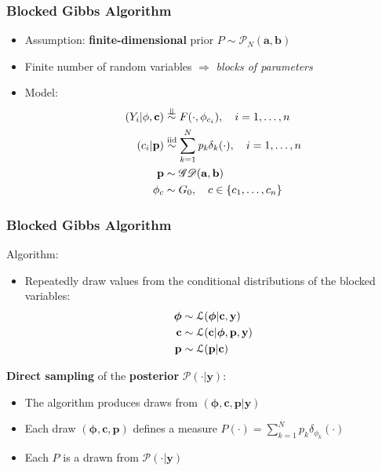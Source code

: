 \begin{frame}
	\frametitle{Blocked Gibbs Algorithm}
	\begin{itemize}
	    \item Assumption: \textbf{finite-dimensional} prior $P \sim  \mathscr{P}_{N}(\mathbf{a},\mathbf{b})$
        \item Finite number of random variables $\Rightarrow$ \textit{blocks of parameters}
        \item Model:
        \begin{align*}
            (Y_{i}|\mathbf{\phi},\mathbf{c})&\indsim F(\cdot,\phi_{c_{i}}), \quad i=1,\dots,n \\
            (c_{i}|\mathbf{p})&\iidsim\sum\limits_{k=1}^N \mathit{p_{k}}\delta_{k}(\cdot), \quad i=1,\dots,n \\
            \mathbf{p} &\sim \mathscr{GD}(\mathbf{a},\mathbf{b}) \\
            \mathbf{\phi}_{c} & \sim G_{0}, \quad c \in \{c_1,\dots, c_n\}
        \end{align*}



	\end{itemize}
\end{frame}




\begin{frame}
	\frametitle{Blocked Gibbs Algorithm}
	Algorithm:
	\begin{itemize}
		\item Repeatedly draw values from the conditional distributions of the blocked variables:
		\begin{align*}
			\boldsymbol\phi &\sim \mathcal L(\boldsymbol\phi | \mathbf{c}, \mathbf{y}) \\
			\mathbf{c} &\sim \mathcal L (\mathbf{c}| \boldsymbol\phi,\mathbf{p}, \mathbf{y}) \\
			\mathbf{p} &\sim \mathcal L (\mathbf{p}| \mathbf{c})
		\end{align*}
	\end{itemize}
	\textbf{Direct sampling} of the \textbf{posterior} $\mathscr{P}(\cdot|\mathbf{y})$:
	\begin{itemize}
    	\item The algorithm produces draws from $(\boldsymbol\phi,\mathbf{c},\mathbf{p}| \mathbf{y})$
		\item Each draw $(\boldsymbol\phi,\mathbf{c},\mathbf{p})$ defines a measure $P(\cdot)= \sum\limits_{k=1}^N  \mathit{p_{k}}\delta_{\phi_{k}}(\cdot) $ %
		\item Each $P$ is a drawn from $\mathscr{P}(\cdot|\mathbf{y})$
	\end{itemize}
\end{frame}

